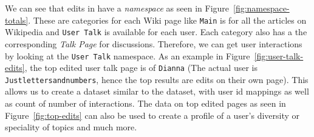 We can see that edits in \usercontrib have a \textit{namespace} as seen in Figure~\ref{fig:namespace-totals}. These are categories for each Wiki page like \texttt{Main} is for all the articles on Wikipedia and \texttt{User Talk} is available for each user. Each category also has a the corresponding \textit{Talk Page} for discussions. Therefore, we can get user interactions by looking at the \texttt{User Talk} namespace. As an example in Figure~\ref{fig:user-talk-edits}, the top edited user talk page is of \texttt{Dianna} (The actual user is \texttt{Justlettersandnumbers}, hence the top results are edits on their own page). This allows us to create a dataset similar to  the \wikitalk  dataset, with user id mappings as well as count of number of interactions. The data on top edited pages as seen in Figure~\ref{fig:top-edits} can also be used to create a profile of a user's diversity or speciality of topics and much more.

